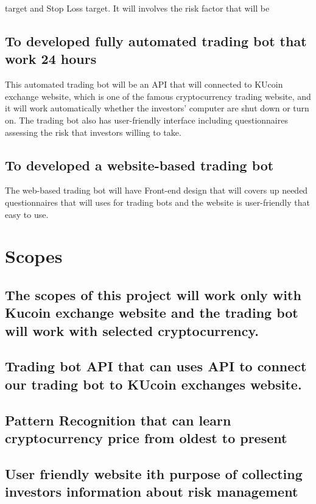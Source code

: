 target and Stop Loss target. It will involves the risk factor that will be
\subsection{To developed fully automated trading bot that work 24 hours}
This automated trading bot will be an API that will connected to KUcoin exchange website, which is one of the famous cryptocurrency trading website,
and it will work automatically whether the investors' computer are shut down or turn on. The trading bot also has user-friendly interface including questionnaires assessing the risk that investors willing to take.
\subsection{To developed a website-based trading bot}
The web-based trading bot will have Front-end design that will covers up
needed questionnaires that will uses for trading bots and the website is user-friendly that
easy to use.

\section{Scopes}
\subsection{The scopes of this project will work only with Kucoin exchange website and the trading bot will work with selected cryptocurrency.}
\subsection{Trading bot API that can uses API to connect our trading bot to KUcoin exchanges website.}

\subsection{Pattern Recognition that can learn cryptocurrency price from oldest to present}

\subsection{User friendly website ith purpose of collecting investors information about risk management}

